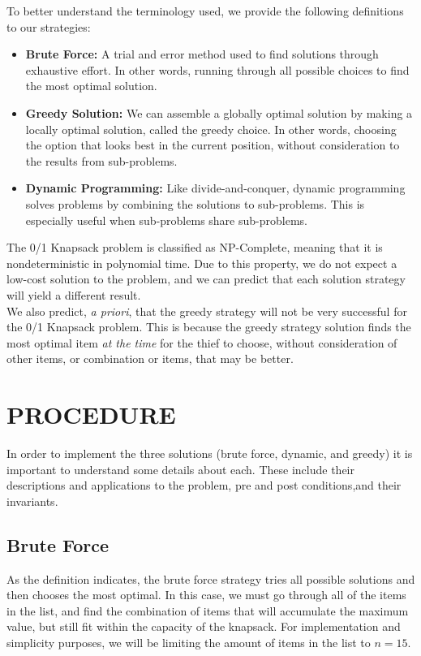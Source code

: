 \documentclass[12pt]{article}
\begin{document}
	To better understand the terminology used, we provide the following definitions to our strategies: 
	
	\begin{itemize}
		\item \textbf{Brute Force:} A trial and error method used to find solutions through exhaustive effort. In other words, running through all possible choices to find the most optimal solution. 
		\item\textbf{Greedy Solution:} We can assemble a globally optimal solution by making a locally optimal solution, called the greedy choice. In other words, choosing the option that looks best in the current position, without consideration to the results from sub-problems.
		\item\textbf{Dynamic Programming:} Like divide-and-conquer, dynamic programming solves problems by combining the solutions to sub-problems. This is especially useful when sub-problems share sub-problems.		
	\end{itemize}
	
	The 0/1 Knapsack problem is classified as NP-Complete, meaning that it is nondeterministic in polynomial time. Due to this property, we do not expect a low-cost solution to the problem, and we can predict that each solution strategy will yield a different result. \\
	
	We also predict, \textit{a priori}, that the greedy strategy will not be very successful for the 0/1 Knapsack problem. This is because the greedy strategy solution finds the most optimal item \textit{at the time} for the thief to choose, without consideration of other items, or combination or items, that may be better. \\
 	
	\section*{PROCEDURE} 
	
    In order to implement the three solutions (brute force, dynamic, and greedy) it is important to understand some details about each. These include their descriptions and applications to the problem, pre and post conditions,and their invariants.

\subsection*{Brute Force}
As the definition indicates, the brute force strategy tries all possible solutions and then chooses the most optimal. In this case, we must go through all of the items in the list, and find the combination of items that will accumulate the maximum value, but still fit within the capacity of the knapsack. For implementation and simplicity purposes, we will be limiting the amount of items in the list to $n = 15$.\\
\end{document}
